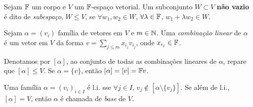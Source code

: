 
\begin{definition}
    Sejam \(\mathbb{F}\) um corpo e \(V\) um \(\mathbb{F}\)-espaço vetorial. Um subconjunto \(W \subset V\) \textbf{não vazio} é dito de \emph{subespaço}, \(W\leq V\), se \(\forall w_1, w_2 \in W\), \(\forall \lambda \in \mathbb{F}\), \( w_1 + \lambda w_2 \in W \).   
\end{definition}

\begin{definition}
    Sejam \(\alpha = (v_i)\) família de vetores em \(V\) e \(m\in \mathbb{N}\). Uma \emph{combinação linear} de \(\alpha\) é um vetor em \(V\) da forma \(v = \sum_{j\leq m} x_{i_j}v_{i_j}\), onde \(x_{i_j} \in \mathbb{F}\).
\end{definition}

\begin{note}
    Denotamos por \([\alpha]\), ao conjunto de todas as combinações lineares de \(\alpha\), repare que \([\alpha]\leq V\). Se \(\alpha = \{v\}\), então \([\alpha] = [v] = \mathbb{F} v\). 
\end{note}

\begin{definition}
    Uma família \(\alpha = (v_i)_{i\in I}\) é l.i. sse \(\forall j \in I\), \(v_j \notin [\alpha \setminus \{v_j\}]\). Se além de l.i., \([\alpha] = V\), então \(\alpha\) é chamada de \emph{base} de \(V\). 
\end{definition}

